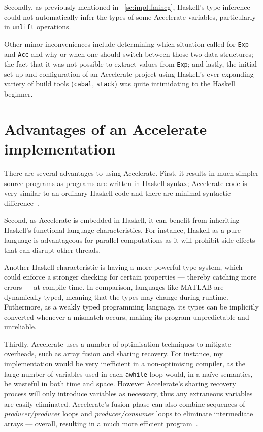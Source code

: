 Secondly, as previously mentioned in ~\ref{se:impl.fmincg}, Haskell's type inference could not automatically infer the types of some Accelerate variables, particularly in \texttt{unlift} operations. 

Other minor inconveniences include determining which situation called for \texttt{Exp} and \texttt{Acc} and why or when one should switch between those two data structures; the fact that it was not possible to extract values from \texttt{Exp}; and lastly, the initial set up and configuration of an Accelerate project using Haskell's ever-expanding variety of build tools (\texttt{cabal}, \texttt{stack}) was quite intimidating to the Haskell beginner.

\section{Advantages of an Accelerate implementation} \label{se:eval.advantages}

There are several advantages to using Accelerate. First, it results in much simpler source programs as programs are written in Haskell syntax; Accelerate code is very similar to an ordinary Haskell code and there are minimal syntactic difference~\cite{Mar13}.

Second, as Accelerate is embedded in Haskell, it can benefit from inheriting Haskell's functional language characteristics. For instance, Haskell as a pure language is advantageous for parallel computations as it will prohibit side effects that can disrupt other threads.

Another Haskell characteristic is having a more powerful type system, which could enforce a stronger checking for certain properties --- thereby catching more errors --- at compile time. In comparison, languages like MATLAB are dynamically typed, meaning that the types may change during runtime. Futhermore, as a weakly typed programming language, its types can be implicitly converted whenever a mismatch occurs, making its program unpredictable and unreliable.

Thirdly, Accelerate uses a number of optimisation techniques to mitigate overheads, such as array fusion and sharing recovery\cite{ChaKelLee11}. For instance, my implementation would be very inefficient in a non-optimising compiler, as the large number of variables used in each \texttt{awhile} loop would, in a na\"ive semantics, be wasteful in both time and space. However Accelerate's sharing recovery process will only introduce variables as necessary, thus any extraneous variables are easily eliminated. Accelerate's fusion phase can also combine sequences of \textit{producer/producer} loops and \textit{producer/consumer} loops to eliminate intermediate arrays --- overall, resulting in a much more efficient program~\cite{McDChaGro}.

